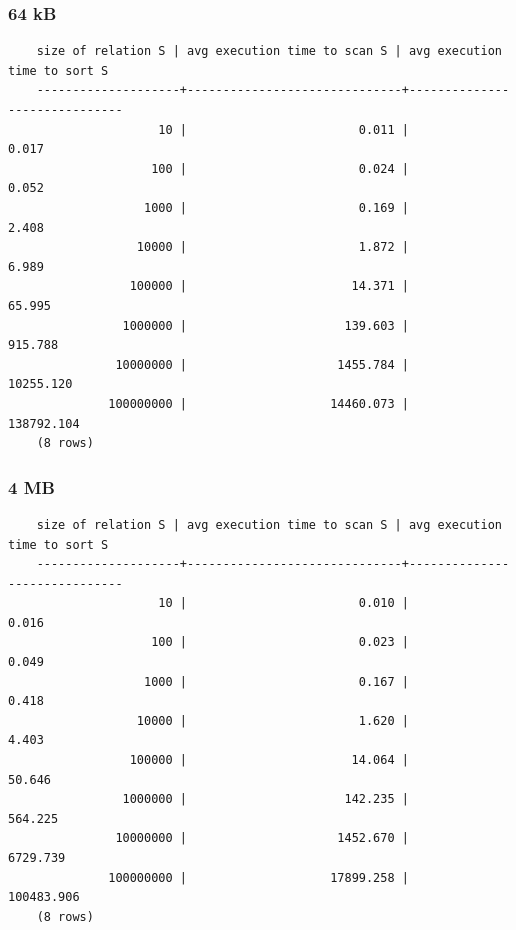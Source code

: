 \documentclass{article}
\begin{document}
  \subsubsection*{64 kB}
  \begin{verbatim}
    size of relation S | avg execution time to scan S | avg execution time to sort S 
    --------------------+------------------------------+------------------------------
                     10 |                        0.011 |                        0.017
                    100 |                        0.024 |                        0.052
                   1000 |                        0.169 |                        2.408
                  10000 |                        1.872 |                        6.989
                 100000 |                       14.371 |                       65.995
                1000000 |                      139.603 |                      915.788
               10000000 |                     1455.784 |                    10255.120
              100000000 |                    14460.073 |                   138792.104
    (8 rows)
  \end{verbatim}
  \subsubsection*{4 MB}
  \begin{verbatim}
    size of relation S | avg execution time to scan S | avg execution time to sort S 
    --------------------+------------------------------+------------------------------
                     10 |                        0.010 |                        0.016
                    100 |                        0.023 |                        0.049
                   1000 |                        0.167 |                        0.418
                  10000 |                        1.620 |                        4.403
                 100000 |                       14.064 |                       50.646
                1000000 |                      142.235 |                      564.225
               10000000 |                     1452.670 |                     6729.739
              100000000 |                    17899.258 |                   100483.906
    (8 rows)
  \end{verbatim}
\end{document}
